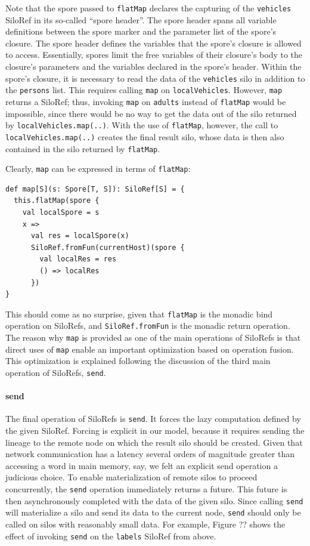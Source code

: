 \documentclass[preprint]{sigplanconf}
\theoremstyle{definition}
\theoremstyle{definition}
\begin{document}
Note that the spore passed to \verb|flatMap| declares the capturing of the
\verb|vehicles| SiloRef in its so-called ``spore header''. The spore header
spans all variable definitions between the spore marker and the parameter list
of the spore's closure. The spore header defines the variables that the
spore's closure is allowed to access. Essentially, spores limit the free
variables of their closure's body to the closure's parameters and the
variables declared in the spore's header. Within the spore's closure, it is
necessary to read the data of the \verb|vehicles| silo in addition to the
\verb|persons| list. This requires calling \verb|map| on \verb|localVehicles|.
However, \verb|map| returns a SiloRef; thus, invoking \verb|map| on
\verb|adults| instead of \verb|flatMap| would be impossible, since there would
be no way to get the data out of the silo returned by
\verb|localVehicles.map(..)|. With the use of \verb|flatMap|, however, the
call to \verb|localVehicles.map(..)| creates the final result silo, whose data
is then also contained in the silo returned by \verb|flatMap|.

Clearly, \verb|map| can be expressed in terms of \verb|flatMap|:

\begin{lstlisting}
def map[S](s: Spore[T, S]): SiloRef[S] = {
  this.flatMap(spore {
    val localSpore = s
    x =>
      val res = localSpore(x)
      SiloRef.fromFun(currentHost)(spore {
        val localRes = res
        () => localRes
      })
}
\end{lstlisting}

This should come as no surprise, given that \verb|flatMap| is the monadic bind
operation on SiloRefs, and \verb|SiloRef.fromFun| is the monadic return
operation. The reason why \verb|map| is provided as one of the main operations
of SiloRefs is that direct uses of \verb|map| enable an important optimization
based on operation fusion. This optimization is explained following the
discussion of the third main operation of SiloRefs, \verb|send|.

\paragraph{send}
The final operation of SiloRefs is \verb|send|. It forces the lazy computation
defined by the given SiloRef. Forcing is explicit in our model, because it
requires sending the lineage to the remote node on which the result silo
should be created. Given that network communication has a latency several
orders of magnitude greater than accessing a word in main memory, say, we felt
an explicit send operation a judicious choice. To enable materialization of
remote silos to proceed concurrently, the \verb|send| operation immediately
returns a future. This future is then asynchronously completed with the data
of the given silo. Since calling \verb|send| will materialize a silo and send
its data to the current node, \verb|send| should only be called on silos with
reasonably small data. For example, Figure ?? shows the effect of invoking
\verb|send| on the \verb|labels| SiloRef from above.
\end{document}
